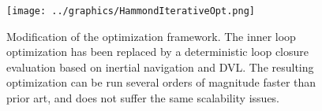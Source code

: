 \begin{figure}[htbp]
   \centering
   \texttt{[image: ../graphics/HammondIterativeOpt.png]} %
   \caption{Modification of the optimization framework. The inner loop optimization has been replaced by a deterministic loop closure evaluation based on inertial navigation and DVL. The resulting optimization can be run several orders of magnitude faster than prior art, and does not suffer the same scalability issues.}
   \label{fig:NestedLoop2}
\end{figure}



%
%
%
%
%
%
%
%
